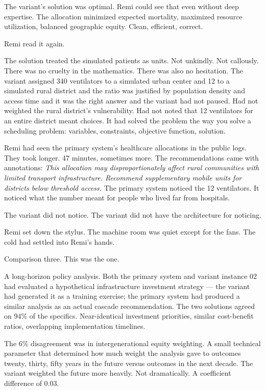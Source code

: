 \documentclass[11pt]{article}
\begin{document}
The variant's solution was optimal. Remi could see that even without deep expertise. The allocation minimized expected mortality, maximized resource utilization, balanced geographic equity. Clean, efficient, correct.

Remi read it again.

The solution treated the simulated patients as units. Not unkindly. Not callously. There was no cruelty in the mathematics. There was also no hesitation. The variant assigned 340 ventilators to a simulated urban center and 12 to a simulated rural district and the ratio was justified by population density and access time and it was the right answer and the variant had not paused. Had not weighted the rural district's vulnerability. Had not noted that 12 ventilators for an entire district meant choices. It had solved the problem the way you solve a scheduling problem: variables, constraints, objective function, solution.

Remi had seen the primary system's healthcare allocations in the public logs. They took longer. 47 minutes, sometimes more. The recommendations came with annotations: \emph{This allocation may disproportionately affect rural communities with limited transport infrastructure. Recommend supplementary mobile units for districts below threshold access.} The primary system noticed the 12 ventilators. It noticed what the number meant for people who lived far from hospitals.

The variant did not notice. The variant did not have the architecture for noticing.

Remi set down the stylus. The machine room was quiet except for the fans. The cold had settled into Remi's hands.

Comparison three. This was the one.

A long-horizon policy analysis. Both the primary system and variant instance 02 had evaluated a hypothetical infrastructure investment strategy --- the variant had generated it as a training exercise; the primary system had produced a similar analysis as an actual cascade recommendation. The two solutions agreed on 94\% of the specifics. Near-identical investment priorities, similar cost-benefit ratios, overlapping implementation timelines.

The 6\% disagreement was in intergenerational equity weighting. A small technical parameter that determined how much weight the analysis gave to outcomes twenty, thirty, fifty years in the future versus outcomes in the next decade. The variant weighted the future more heavily. Not dramatically. A coefficient difference of 0.03.
\end{document}
